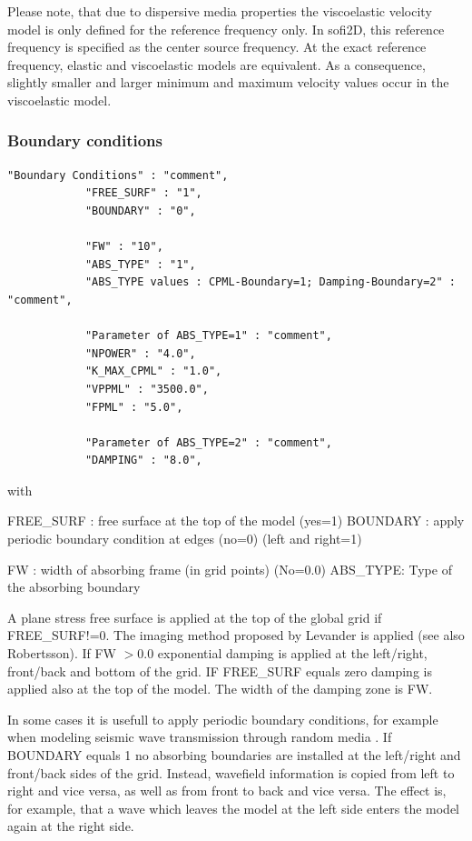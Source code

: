 \documentclass[11pt,onecolumn,oneside]{article}
\begin{document}
Please note, that due to dispersive media properties the viscoelastic velocity model is only defined for the reference frequency only. In sofi2D, this reference frequency is specified as the center source frequency. At the exact reference frequency, elastic and viscoelastic models are equivalent. As a consequence, slightly smaller and larger minimum and maximum velocity values occur in the viscoelastic model.

\subsubsection{Boundary conditions}
\label{abs}
\begin{verbatim}
"Boundary Conditions" : "comment",
			"FREE_SURF" : "1",
			"BOUNDARY" : "0",

			"FW" : "10",
			"ABS_TYPE" : "1",
			"ABS_TYPE values : CPML-Boundary=1; Damping-Boundary=2" : "comment",

			"Parameter of ABS_TYPE=1" : "comment",
			"NPOWER" : "4.0",
			"K_MAX_CPML" : "1.0",
			"VPPML" : "3500.0",
			"FPML" : "5.0",

			"Parameter of ABS_TYPE=2" : "comment",
			"DAMPING" : "8.0",

\end{verbatim}

with

FREE\_SURF : free surface at the top of the model (yes=1) \newline
BOUNDARY : apply periodic boundary condition at edges (no=0) (left and right=1) 

FW : width of absorbing frame (in grid points) (No=0.0) \newline
ABS\_TYPE: Type of the absorbing boundary \newline 

A plane stress free surface is applied at the top of the global grid if FREE\_SURF!=0. The imaging method proposed by Levander  is applied (see also Robertsson). If FW $>$0.0 exponential damping \cite{cerjan:85} is applied at the left/right, front/back and bottom of the grid. IF FREE\_SURF equals zero damping is applied also at the top of the model. The width of the damping zone is FW.

In some cases it is usefull to apply periodic boundary conditions, for example when modeling seismic wave transmission through random media \cite{bohlen:02}. If BOUNDARY equals 1 no absorbing boundaries are installed at the left/right and front/back sides of the grid. Instead, wavefield information is copied from left to right and vice versa, as well as from front to back and vice versa. The effect is, for example, that a wave which leaves the model at the left side enters the model again at the right side.
 
\end{document}
